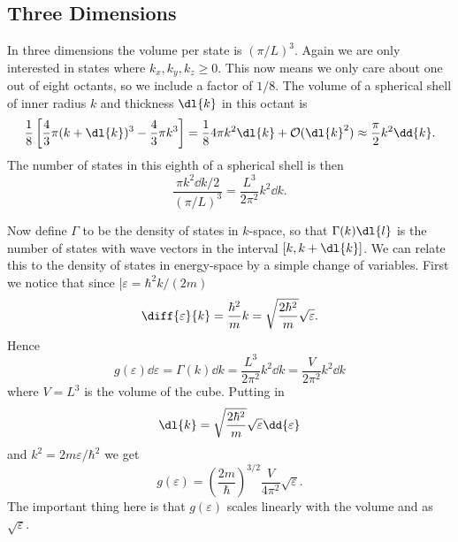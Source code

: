\documentclass[fleqn]{NotesClass}
\newcommand*{\order}{\mathcal{O}}
\begin{document}
    \subsection{Three Dimensions}
    In three dimensions the volume per state is \((\pi/L)^3\).
    Again we are only interested in states where \(k_x, k_y, k_z \ge 0\).
    This now means we only care about one out of eight octants, so we include a factor of \(1/8\).
    The volume of a spherical shell of inner radius \(k\) and thickness \(\dl{k}\) in this octant is
    \begin{equation}
        \frac{1}{8}\left[ \frac{4}{3}\pi(k + \dl{k})^3 - \frac{4}{3}\pi k^3 \right] = \frac{1}{8}4\pi k^2\dl{k} + \order(\dl{k}^2) \approx \frac{\pi}{2}k^2\dd{k}.
    \end{equation}
    The number of states in this eighth of a spherical shell is then
    \begin{equation}
        \frac{\pi k^2\dd{k}/2}{(\pi/L)^3} = \frac{L^3}{2\pi^2} k^2\dd{k}.
    \end{equation}
    
    Now define \(\Gamma\) to be the density of states in \(k\)-space, so that \(\Gamma(k)\dl{l}\) is the number of states with wave vectors in the interval \([k, k + \dl{k}]\).
    We can relate this to the density of states in energy-space by a simple change of variables.
    First we notice that since |\(\varepsilon = \hbar^2k/(2m)\)
    \begin{equation}
        \diff{\varepsilon}{k} = \frac{\hbar^2}{m}k = \sqrt{\frac{2\hbar^2}{m}}\sqrt{\varepsilon}.
    \end{equation}
    Hence
    \begin{equation}
        g(\varepsilon)\dd{\varepsilon} = \Gamma(k)\dd{k} = \frac{L^3}{2\pi^2} k^2 \dd{k} = \frac{V}{2\pi^2}k^2\dd{k}
    \end{equation}
    where \(V = L^3\) is the volume of the cube.
    Putting in
    \begin{equation}
        \dl{k} = \sqrt{\frac{2\hbar^2}{m}} \sqrt{\varepsilon} \dd{\varepsilon}
    \end{equation}
    and \(k^2 = 2m\varepsilon/\hbar^2\) we get
    \begin{equation}
        g(\varepsilon) = \left( \frac{2m}{\hbar} \right)^{3/2} \frac{V}{4\pi^2} \sqrt{\varepsilon}.
    \end{equation}
    The important thing here is that \(g(\varepsilon)\) scales linearly with the volume and as \(\sqrt{\varepsilon}\).
    
\end{document}
